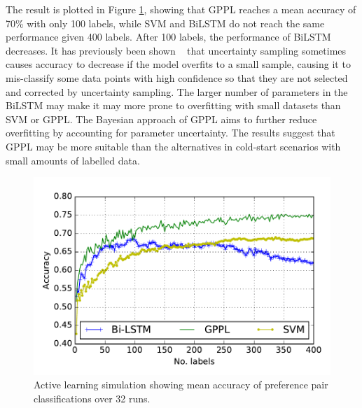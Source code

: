 The result is plotted in Figure \ref{fig:active_learning}, showing that GPPL
reaches a mean accuracy of 70\% with only 100 labels, while SVM and BiLSTM do not reach the same performance given 400 labels. 
After 100 labels, the 
performance of BiLSTM decreases. It has previously been shown ~\cite{cawley2011baseline,guyon2011results,settles2010active} that uncertainty sampling sometimes causes accuracy to decrease if the model overfits to a small sample, causing it to mis-classify some data points with high confidence so that they are not selected and corrected by uncertainty sampling.  
The larger number of parameters in the BiLSTM may make it may more prone to overfitting with small datasets than SVM or GPPL. 
The Bayesian approach of GPPL aims to further 
reduce overfitting by accounting for parameter uncertainty.
The results suggest that GPPL may be more suitable than the alternatives in cold-start scenarios with small amounts of labelled data. 
\begin{figure}
\centering
\includegraphics[width=0.9\columnwidth,trim=14 17 10 22,clip=true]{figures/active_learning_2/test_acc}
\caption{Active learning simulation showing mean accuracy of preference pair classifications over 32 runs.}
\label{fig:active_learning}
\end{figure}



